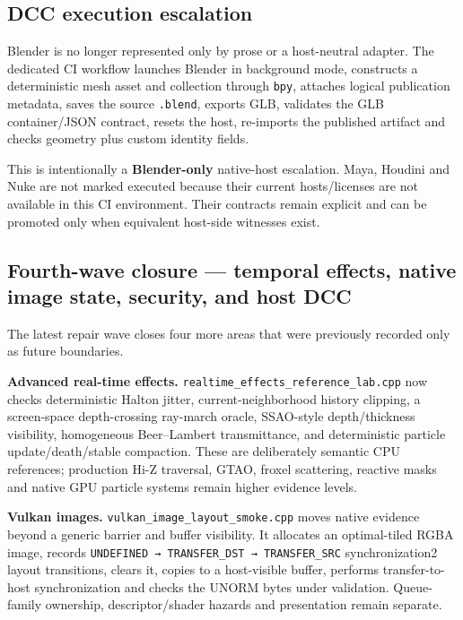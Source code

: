 \subsection{DCC execution escalation}\label{appendix-2358b21a702d-dcc-execution-escalation}

Blender is no longer represented only by prose or a host-neutral adapter. The dedicated CI workflow launches Blender in background mode, constructs a deterministic mesh asset and collection through \texttt{bpy}, attaches logical publication metadata, saves the source \texttt{.blend}, exports GLB, validates the GLB container/JSON contract, resets the host, re-imports the published artifact and checks geometry plus custom identity fields.

This is intentionally a \textbf{Blender-only} native-host escalation. Maya, Houdini and Nuke are not marked executed because their current hosts/licenses are not available in this CI environment. Their contracts remain explicit and can be promoted only when equivalent host-side witnesses exist.

\subsection{Fourth-wave closure --- temporal effects, native image state, security, and host DCC}\label{appendix-2358b21a702d-fourth-wave-closure-temporal-effects-native-image-state-security-and-host-dcc}

The latest repair wave closes four more areas that were previously recorded only as future boundaries.

\textbf{Advanced real-time effects.} \texttt{realtime\_effects\_reference\_lab.cpp} now checks deterministic Halton jitter, current-neighborhood history clipping, a screen-space depth-crossing ray-march oracle, SSAO-style depth/thickness visibility, homogeneous Beer--Lambert transmittance, and deterministic particle update/death/stable compaction. These are deliberately semantic CPU references; production Hi-Z traversal, GTAO, froxel scattering, reactive masks and native GPU particle systems remain higher evidence levels.

\textbf{Vulkan images.} \texttt{vulkan\_image\_layout\_smoke.cpp} moves native evidence beyond a generic barrier and buffer visibility. It allocates an optimal-tiled RGBA image, records \texttt{UNDEFINED\ →\ TRANSFER\_DST\ →\ TRANSFER\_SRC} synchronization2 layout transitions, clears it, copies to a host-visible buffer, performs transfer-to-host synchronization and checks the UNORM bytes under validation. Queue-family ownership, descriptor/shader hazards and presentation remain separate.

